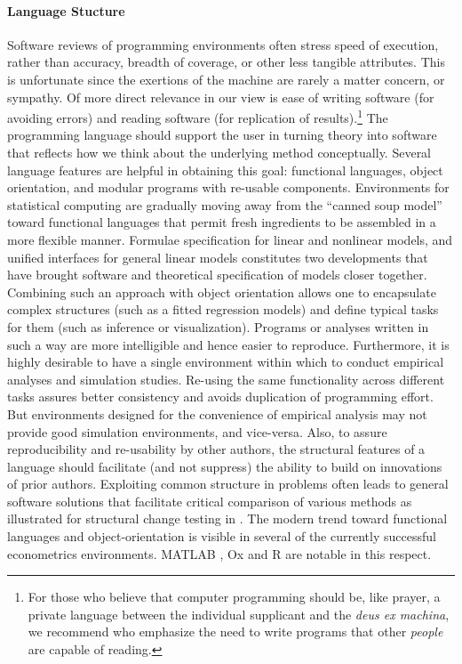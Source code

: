 \documentclass[10pt,a4paper,twoside]{article}
\let\proglang=\textsf
\begin{document}
\paragraph{Language Stucture}
Software reviews of programming environments often stress speed
of execution, rather than accuracy, breadth of coverage, or other less tangible
attributes. This is unfortunate since the exertions of the machine are rarely a
matter concern, or sympathy. Of more direct relevance in our view is ease of
writing software (for avoiding errors) and reading software
(for replication of results).\footnote{For those who believe that computer
programming should be, like prayer, a private language between the individual
supplicant and the \emph{deus ex machina}, we recommend 
\cite{repro:Kernighan+Plauger:1974} who emphasize the need to write programs 
that other \emph{people} are capable of reading.} The programming language
should support the user in turning theory into software that reflects how
we think about the underlying method conceptually. Several language features are 
helpful in obtaining this goal: functional languages, object orientation, and
modular programs with re-usable components.
Environments for statistical
computing are gradually moving away from the ``canned soup model'' toward 
functional languages  that permit fresh ingredients to be assembled in a more flexible
manner. Formulae specification for linear and nonlinear models, and unified  
interfaces for general linear models constitutes two developments that have
brought software and theoretical specification of models closer together.  
Combining such an approach with object orientation allows one to encapsulate
complex structures (such as a fitted regression models) and define typical
tasks for them (such as inference or visualization). Programs or analyses
written in such a way are more intelligible and hence easier to reproduce.
Furthermore, it is highly desirable to have a single environment within which
to conduct empirical analyses and simulation studies. Re-using the same functionality 
across different tasks assures better consistency and avoids duplication of programming effort.
But environments designed for the convenience of empirical analysis may not provide
good simulation environments, and vice-versa. Also, to assure reproducibility
and re-usability by other authors, the structural features of a language should
facilitate (and not suppress) the ability to build on innovations of prior authors.  
Exploiting common structure in problems
often leads to general software solutions that facilitate critical comparison
of various methods as illustrated for structural change testing
in \cite{repro:Zeileis:2006a}. The modern trend toward functional
languages and object-orientation is visible in several of the currently 
successful econometrics environments.
\proglang{MATLAB} \citep[\url{http://www.MathWorks.com/}]{repro:MATLAB:2007},
\proglang{Ox} \citep[\url{http://www.doornik.com/ox/}]{repro:Ox:2006} and
\proglang{R} \citep[\url{http://www.R-project.org/}]{repro:R:2007}
are notable in this respect.  
\end{document}
